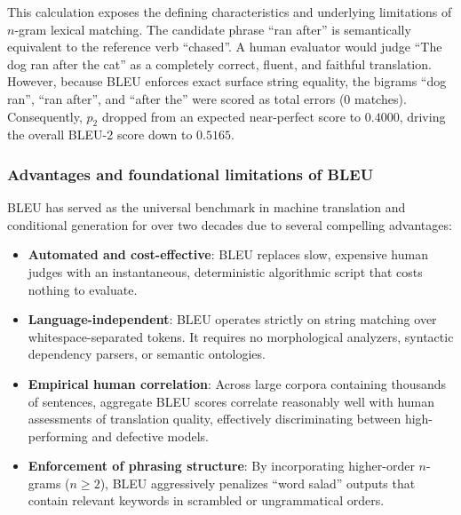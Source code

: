 \documentclass[../../main.tex]{subfiles}
\begin{document}
This calculation exposes the defining characteristics and underlying limitations of $n$-gram lexical matching. The candidate phrase ``ran after'' is semantically equivalent to the reference verb ``chased''. A human evaluator would judge ``The dog ran after the cat'' as a completely correct, fluent, and faithful translation. However, because BLEU enforces exact surface string equality, the bigrams ``dog ran'', ``ran after'', and ``after the'' were scored as total errors ($0$ matches). Consequently, $p_2$ dropped from an expected near-perfect score to $0.4000$, driving the overall BLEU-2 score down to $0.5165$.

\subsubsection{Advantages and foundational limitations of BLEU}
BLEU has served as the universal benchmark in machine translation and conditional generation for over two decades due to several compelling advantages:
\begin{itemize}
    \item \textbf{Automated and cost-effective}: BLEU replaces slow, expensive human judges with an instantaneous, deterministic algorithmic script that costs nothing to evaluate.
    \item \textbf{Language-independent}: BLEU operates strictly on string matching over whitespace-separated tokens. It requires no morphological analyzers, syntactic dependency parsers, or semantic ontologies.
    \item \textbf{Empirical human correlation}: Across large corpora containing thousands of sentences, aggregate BLEU scores correlate reasonably well with human assessments of translation quality, effectively discriminating between high-performing and defective models.
    \item \textbf{Enforcement of phrasing structure}: By incorporating higher-order $n$-grams ($n \ge 2$), BLEU aggressively penalizes ``word salad'' outputs that contain relevant keywords in scrambled or ungrammatical orders.
\end{itemize}
\end{document}
